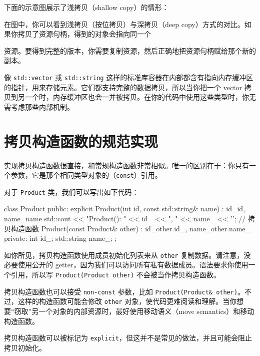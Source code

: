 下面的示意图展示了浅拷贝（shallow copy）的情形：

在图中，你可以看到浅拷贝（按位拷贝）与深拷贝（deep copy）方式的对比。如果你拷贝了资源句柄，得到的对象会指向同一个


资源。要得到完整的版本，你需要复制资源，然后正确地把资源句柄赋给那个新的副本。

像 \texttt{std::vector} 或 \texttt{std::string} 这样的标准库容器在内部都含有指向内存缓冲区的指针，用来存储元素。它们都支持完整的数据拷贝，所以当你把一个 vector 拷贝到另一个时，内存缓冲区也会一并被拷贝。在你的代码中使用这些类型时，你无需考虑那些内部机制。

\section{拷贝构造函数的规范实现}

实现拷贝构造函数很直接，和常规构造函数非常相似。唯一的区别在于：你只有一个参数，它是那个相同类型对象的（\texttt{const}）引用。

对于 \texttt{Product} 类，我们可以写出如下代码：

\begin{codebox}[cpp]
class Product {
public:
explicit Product(int id, const std::string& name)
: id_{id}, name_{name} {
std::cout << "Product(): " << id_ << ", " << name_ << '\n';
}
// 拷贝构造函数
Product(const Product& other)
: id_{other.id_}, name_{other.name_} { }
private:
int id_;
std::string name_;
};
\end{codebox}

如你所见，拷贝构造函数使用成员初始化列表来从 \texttt{other} 复制数据。请注意，没必要使用公开的 getter，因为我们可以访问所有私有数据成员。语法要求你使用一个引用，所以写 \texttt{Product(Product other)} 不会被当作拷贝构造函数。

\begin{myInfoBox}
拷贝构造函数也可以接受 \texttt{non-const} 参数，比如 \texttt{Product(Product\& other)}。不过，这样的构造函数可能会修改 \texttt{other} 对象，使代码更难阅读和理解。当你想要“窃取”另一个对象的内部资源时，最好使用移动语义（move semantics）和移动构造函数。
\end{myInfoBox}


\begin{myInfoBox}
拷贝构造函数可以被标记为 \texttt{explicit}，但这并不是常见的做法，并且可能会阻止拷贝初始化。
\end{myInfoBox}


